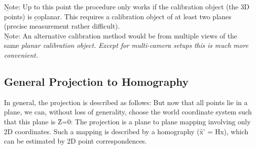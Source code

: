 \b{Note:} Up to this point the procedure only works if the calibration object (the 3D points) is \b{coplanar}. This requires a calibration object of at least two planes (precise measurement rather difficult).\\

\b{Note:} An alternative calibration method would be from multiple views of the same \it{planar} calibration object. Except for multi-camera setups this is much more convenient.

\subsection{General Projection to Homography}
In general, the projection is described as follows:
But now that all points lie in a plane, we can, without loss of generality, choose the world coordinate system such that this plane is \f{Z=0}:
The projection is a plane to plane mapping involving only 2D coordinates. Such a mapping is described by a homography (\f{x' = Hx}), which can be estimated by 2D point correspondences.\\

